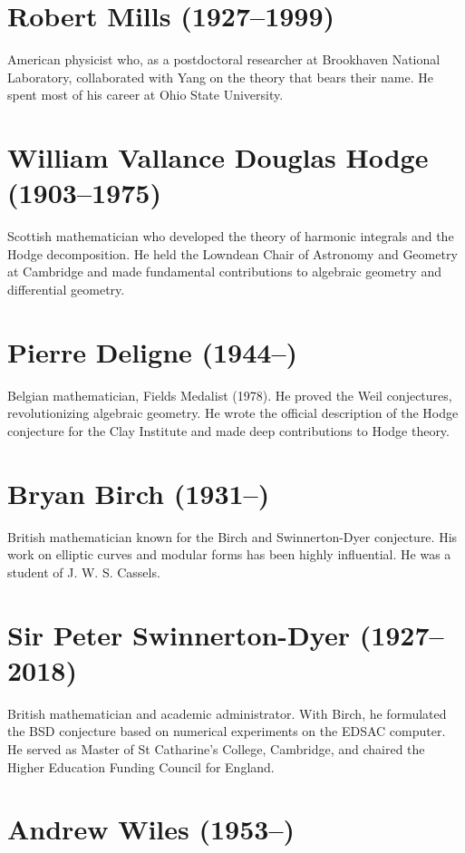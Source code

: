 \section*{Robert Mills (1927--1999)}

American physicist who, as a postdoctoral researcher at Brookhaven National Laboratory, collaborated with Yang on the theory that bears their name. He spent most of his career at Ohio State University.

\section*{William Vallance Douglas Hodge (1903--1975)}

Scottish mathematician who developed the theory of harmonic integrals and the Hodge decomposition. He held the Lowndean Chair of Astronomy and Geometry at Cambridge and made fundamental contributions to algebraic geometry and differential geometry.

\section*{Pierre Deligne (1944--)}

Belgian mathematician, Fields Medalist (1978). He proved the Weil conjectures, revolutionizing algebraic geometry. He wrote the official description of the Hodge conjecture for the Clay Institute and made deep contributions to Hodge theory.

\section*{Bryan Birch (1931--)}

British mathematician known for the Birch and Swinnerton-Dyer conjecture. His work on elliptic curves and modular forms has been highly influential. He was a student of J. W. S. Cassels.

\section*{Sir Peter Swinnerton-Dyer (1927--2018)}

British mathematician and academic administrator. With Birch, he formulated the BSD conjecture based on numerical experiments on the EDSAC computer. He served as Master of St Catharine's College, Cambridge, and chaired the Higher Education Funding Council for England.

\section*{Andrew Wiles (1953--)}

